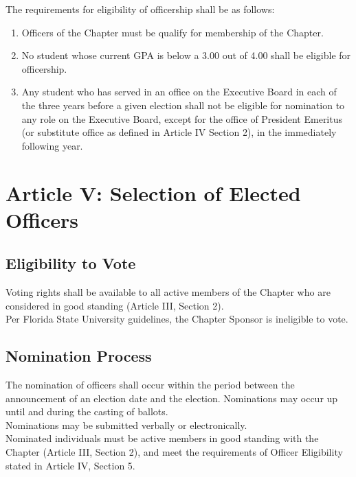 \documentclass{article}
\begin{document}
The requirements for eligibility of officership shall be as follows:

\begin{enumerate}
\item
  Officers of the Chapter must be qualify for membership of the Chapter.
\item
  No student whose current GPA is below a 3.00 out of 4.00 shall be
  eligible for officership.
\item
  Any student who has served in an office on the Executive Board in each
  of the three years before a given election shall not be eligible for
  nomination to any role on the Executive Board, except for the office of President Emeritus (or substitute office as defined in Article IV Section 2), in the immediately following year.
\end{enumerate}

\section{Article V: Selection of Elected Officers}

\subsection{Eligibility to Vote}

Voting rights shall be available to all active members of the Chapter
who are considered in good standing (Article III, Section 2).\\

Per Florida State University guidelines, the Chapter Sponsor is
ineligible to vote.

\subsection{Nomination Process}

The nomination of officers shall occur within the period between the
announcement of an election date and the election. Nominations may occur
up until and during the casting of ballots.\\

Nominations may be submitted verbally or electronically.\\

Nominated individuals must be active members in good standing with the
Chapter (Article III, Section 2), and meet the requirements of Officer
Eligibility stated in Article IV, Section 5.
\end{document}
